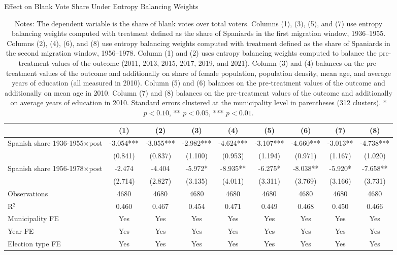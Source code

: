 \begin{table}[!h]
\caption{Effect on Blank Vote Share Under Entropy Balancing Weights}
\renewcommand{\arraystretch}{1.25}
\centering
\begin{tabular}[t]{lcccccccc}
\hline
  & (1) & (2) & (3) & (4) & (5) & (6) & (7) & (8)\\
\hline
Spanish share 1936-1955$\times$post & -3.054*** & -3.055*** & -2.982*** & -4.624*** & -3.107*** & -4.660*** & -3.013** & -4.738***\\
 & (0.841) & (0.837) & (1.100) & (0.953) & (1.194) & (0.971) & (1.167) & (1.020)\\
Spanish share 1956-1978$\times$post & -2.474 & -4.404 & -5.972* & -8.935** & -6.275* & -8.038** & -5.920* & -7.658**\\
 & (2.714) & (2.827) & (3.135) & (4.011) & (3.311) & (3.769) & (3.166) & (3.731)\\

\addlinespace
Observations & 4680 & 4680 & 4680 & 4680 & 4680 & 4680 & 4680 & 4680\\
R$^2$ & 0.460 & 0.467 & 0.454 & 0.471 & 0.449 & 0.468 & 0.450 & 0.466\\
Municipality FE & Yes & Yes & Yes & Yes & Yes & Yes & Yes & Yes\\
Year FE & Yes & Yes & Yes & Yes & Yes & Yes & Yes & Yes\\
Election type FE & Yes & Yes & Yes & Yes & Yes & Yes & Yes & Yes\\
\hline
\end{tabular}
\vspace{0.3em}
\captionsetup{justification=justified, singlelinecheck=false}
\caption*{\footnotesize Notes: The dependent variable is the share of blank votes over total voters. Columns (1), (3), (5), and (7) use entropy balancing weights computed with treatment defined as the share of Spaniards in the first migration window, 1936–1955. Columns (2), (4), (6), and (8) use entropy balancing weights computed with treatment defined as the share of Spaniards in the second migration window, 1956–1978. Column (1) and (2) uses entropy balancing weights computed to balance the pre-treatment values of the outcome (2011, 2013, 2015, 2017, 2019, and 2021). Column (3) and (4) balances on the pre-treatment values of the outcome and additionally on share of female population, population density, mean age, and average years of education (all measured in 2010). Column (5) and (6) balances on the pre-treatment values of the outcome and additionally on mean age in 2010. Column (7) and (8) balances on the pre-treatment values of the outcome and additionally on average years of education in 2010. Standard errors clustered at the municipality level in parentheses (312 clusters). * $p<0.10$, ** $p<0.05$, *** $p<0.01$.}
\end{table}
